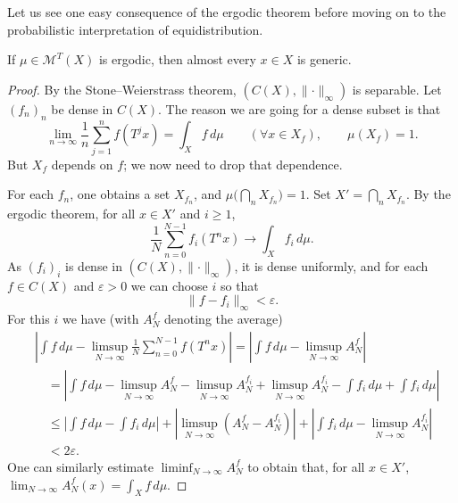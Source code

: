 \documentclass[11pt,a4paper]{article}
\begin{document}
Let us see one easy consequence of the ergodic theorem before moving on to
the probabilistic interpretation of equidistribution.

\setcounter{theorem}{23}\begin{proposition}
If $\mu\in\mathcal M^T(X)$ is ergodic, then almost every $x\in X$ is generic.
\end{proposition}

\begin{proof}
By the Stone--Weierstrass theorem, $(C(X),\lVert\cdot\rVert_\infty)$ is
separable. Let
$(f_n)_n$ be dense in $C(X)$. The reason we are going for a dense subset is
that
\[
  \lim_{n\to\infty}\frac1n\sum_{j=1}^n f(T^jx)
  =\int_X f\,d\mu\qquad(\forall x\in X_f),\qquad\mu(X_f)=1.
\]
But $X_f$ depends on $f$; we now need to drop that dependence.

For each $f_n$, one obtains a set $X_{f_n}$, and
$\mu\bigl(\bigcap_nX_{f_n}\bigr)=1$. Set $X'=\bigcap_nX_{f_n}$. By the
ergodic theorem, for all $x\in X'$ and $i\geq1$,
\[
  \frac1N\sum_{n=0}^{N-1}f_i(T^nx)\longrightarrow\int_X f_i\,d\mu.
\]
As $(f_i)_i$ is dense in $(C(X),\lVert\cdot\rVert_\infty)$, it is dense
uniformly, and for each $f\in C(X)$ and $\varepsilon>0$ we can choose $i$ so that
\[
  \|f-f_i\|_\infty<\varepsilon.
\]
For this $i$ we have
(with $A_N^f$ denoting the average)
\begin{align*}
  &\left|\int f\,d\mu-\limsup_{N\to\infty}
    \frac1N\sum_{n=0}^{N-1}f(T^nx)\right|
  =\left|\int f\,d\mu-\limsup_{N\to\infty}A_N^f\right|\\
  &\quad=\left|\int f\,d\mu-\limsup_{N\to\infty}A_N^f
    -\limsup_{N\to\infty}A_N^{f_i}
    +\limsup_{N\to\infty}A_N^{f_i}
    -\int f_i\,d\mu+\int f_i\,d\mu\right|\\
  &\quad\leq\left|\int f\,d\mu-\int f_i\,d\mu\right|
    +\left|\limsup_{N\to\infty}(A_N^f-A_N^{f_i})\right|
    +\left|\int f_i\,d\mu-\limsup_{N\to\infty}A_N^{f_i}\right|\\
  &\quad<2\varepsilon.
\end{align*}
One can similarly estimate $\liminf_{N\to\infty}A_N^f$ to obtain that,
for all $x\in X'$, $\lim_{N\to\infty}A_N^f(x)=\int_X f\,d\mu$.
\end{proof}
\end{document}
